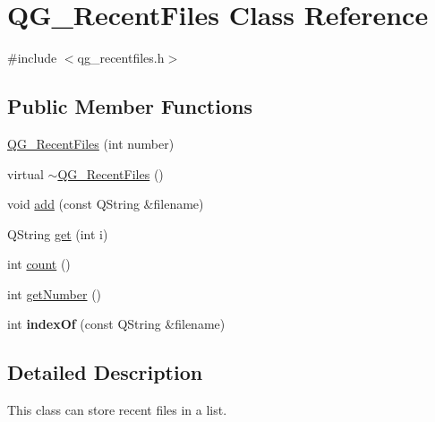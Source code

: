 \hypertarget{classQG__RecentFiles}{\section{Q\-G\-\_\-\-Recent\-Files Class Reference}
\label{classQG__RecentFiles}
}


{\ttfamily \#include $<$qg\-\_\-recentfiles.\-h$>$}

\subsection*{Public Member Functions}
\begin{DoxyCompactItemize}
\item 
\hyperlink{classQG__RecentFiles_ac3908f55b3c631b6f000926e28ee2ded}{Q\-G\-\_\-\-Recent\-Files} (int number)
\item 
virtual \hyperlink{classQG__RecentFiles_ae9bc5e65079cdc613a0a9ec03bd265fe}{$\sim$\-Q\-G\-\_\-\-Recent\-Files} ()
\item 
void \hyperlink{classQG__RecentFiles_a60402f6f71b799a39c0a940cb172adab}{add} (const Q\-String \&filename)
\item 
Q\-String \hyperlink{classQG__RecentFiles_a876762356a6f2aa83d5bfb8a0b3a1634}{get} (int i)
\item 
int \hyperlink{classQG__RecentFiles_a6cd7fec338de5f02018fc9d446d8b2b1}{count} ()
\item 
int \hyperlink{classQG__RecentFiles_a46798bff2f7e30596c174989224b76dc}{get\-Number} ()
\item 
\hypertarget{classQG__RecentFiles_a87630bd46eb5293b17925923bca0b23e}{int {\bfseries index\-Of} (const Q\-String \&filename)}\label{classQG__RecentFiles_a87630bd46eb5293b17925923bca0b23e}

\end{DoxyCompactItemize}


\subsection{Detailed Description}
This class can store recent files in a list. 

